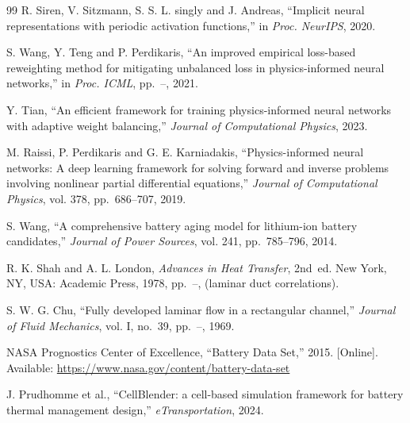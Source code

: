 \documentclass[journal,10pt,compsoc,onecolumn]{IEEEtran}
\begin{document}
\begin{thebibliography}{99}
R. Siren, V. Sitzmann, S. S. L. singly and J. Andreas,
``Implicit neural representations with periodic activation functions,''
in \emph{Proc. NeurIPS}, 2020.

S. Wang, Y. Teng and P. Perdikaris,
``An improved empirical loss-based reweighting method for mitigating
unbalanced loss in physics-informed neural networks,''
in \emph{Proc. ICML}, pp.~--, 2021.

Y. Tian, ``An efficient framework for training physics-informed neural
networks with adaptive weight balancing,'' \emph{Journal of Computational
Physics}, 2023.

M. Raissi, P. Perdikaris and G. E. Karniadakis,
``Physics-informed neural networks: A deep learning framework for solving
forward and inverse problems involving nonlinear partial differential
equations,'' \emph{Journal of Computational Physics}, vol. 378, pp.~686--707,
2019.

S. Wang, ``A comprehensive battery aging model for lithium-ion battery
candidates,'' \emph{Journal of Power Sources}, vol. 241, pp.~785--796, 2014.

R. K. Shah and A. L. London,
\emph{Advances in Heat Transfer}, 2nd~ed. New York, NY, USA:
Academic Press, 1978, pp.~--, (laminar duct correlations).

S. W. G. Chu, ``Fully developed laminar flow in a rectangular channel,''
\emph{Journal of Fluid Mechanics}, vol. I, no.~39, pp.~--, 1969.

NASA Prognostics Center of Excellence,
``Battery Data Set,'' 2015. [Online]. Available:
\url{https://www.nasa.gov/content/battery-data-set}

J. Prudhomme et al., ``CellBlender: a cell-based simulation framework for
battery thermal management design,'' \emph{eTransportation}, 2024.
\end{thebibliography}
\end{document}
